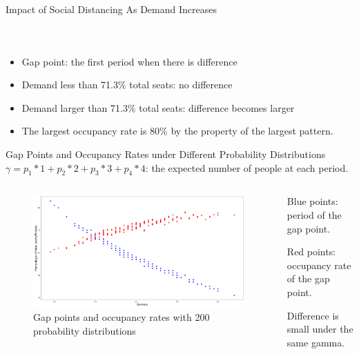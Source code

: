 \begin{frame}{Impact of Social Distancing As Demand Increases}
\begin{columns}
\begin{figure}[ht]
          \end{figure}
      \end{columns}
      \begin{itemize}
        \item Gap point: the first period when there is difference 
        \item Demand {\color{green}less than} 71.3\% total seats: no difference
        \item Demand {\color{violet}larger than} 71.3\% total seats: difference becomes larger
        \item The largest occupancy rate is 80\% by the property of the largest pattern.
      \end{itemize}
  \end{frame}

    \begin{frame}{Gap Points and Occupancy Rates under Different Probability Distributions}
      \scriptsize
      $\gamma = p_1 * 1 + p_2 * 2 + p_3 * 3 + p_4 * 4$: the expected number of people at each period.

      \begin{columns}
      \begin{column}{0.7\textwidth}
      
      \begin{figure}[ht]
        \centering
        \includegraphics[width = 1\textwidth]{./images/gamma1.pdf}
        \caption{Gap points and occupancy rates with 200 probability distributions}
    \end{figure}
  \end{column}
    \begin{column}{0.3\textwidth}
    \scriptsize
    {\color{blue} Blue points}: period of the gap point.
      \vspace{0.2cm}

    {\color{red} Red points}: occupancy rate of the gap point. 
    \vspace{0.2cm}

    Difference is small under the same gamma.
  \end{column}
  \end{columns}
    \end{frame}

